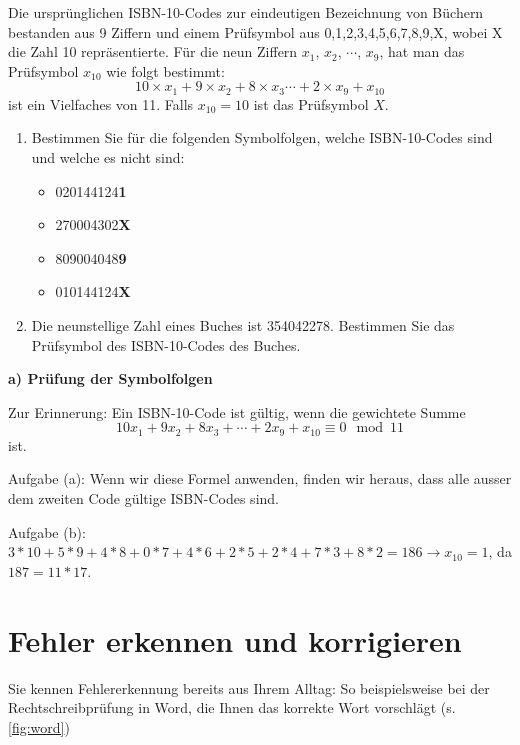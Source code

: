 \begin{myexercise}
    Die ursprünglichen \gls{ISBN}-10-Codes zur eindeutigen Bezeichnung von Büchern bestanden aus 9 Ziffern und einem Prüfsymbol aus {0,1,2,3,4,5,6,7,8,9,X}, wobei X die Zahl 10 repräsentierte. Für die neun Ziffern $x_1$, $x_2$, $\cdots$, $x_9$, hat man das Prüfsymbol $x_{10}$ wie folgt bestimmt:
    \[10\times x_1+9\times x_2+8\times x_3\cdots+2\times x_9 + x_{10}\]
    ist ein Vielfaches von 11. Falls $x_{10} = 10$ ist das Prüfsymbol $X$.
    \begin{enumerate}
        \item Bestimmen Sie für die folgenden Symbolfolgen, welche \gls{ISBN}-10-Codes sind und welche es nicht sind:
              \begin{itemize}
                  \item 020144124\textbf{1}
                  \item 270004302\textbf{X}
                  \item 809004048\textbf{9}
                  \item 010144124\textbf{X}
              \end{itemize}
        \item Die neunstellige Zahl eines Buches ist 354042278. Bestimmen Sie das Prüfsymbol des \gls{ISBN}-10-Codes des Buches.
    \end{enumerate}
    \begin{myanswer}
        \textbf{a) Prüfung der Symbolfolgen}

        Zur Erinnerung: Ein \gls{ISBN}-10-Code ist gültig, wenn die gewichtete Summe
        \[
            10x_1 + 9x_2 + 8x_3 + \cdots + 2x_9 + x_{10} \equiv 0 \mod 11
        \]
        ist.

        Aufgabe (a): Wenn wir diese Formel anwenden, finden wir heraus, dass alle ausser dem zweiten Code gültige \gls{ISBN}-Codes sind.

        Aufgabe (b): $3*10+5*9+4*8+0*7+4*6+2*5+2*4+7*3+8*2=186 \rightarrow x_{10}=1$, da $187=11*17$.

    \end{myanswer}

\end{myexercise}

\section{Fehler erkennen und korrigieren}

Sie kennen Fehlererkennung bereits aus Ihrem Alltag: So beispielsweise bei der Rechtschreibprüfung in Word, die Ihnen das korrekte Wort vorschlägt (s. \cref{fig:word})

